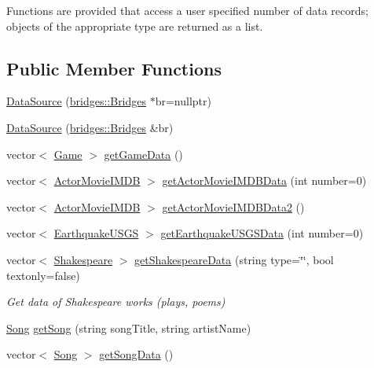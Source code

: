 Functions are provided that access a user specified number of data records; objects of the appropriate type are returned as a list. \subsection*{Public Member Functions}
\begin{DoxyCompactItemize}
\item 
\hyperlink{classbridges_1_1_data_source_afc95b52d2ca03a92c1f1ee1594a097c7}{Data\+Source} (\hyperlink{classbridges_1_1_bridges}{bridges\+::\+Bridges} $\ast$br=nullptr)
\item 
\hyperlink{classbridges_1_1_data_source_a0da0dc59d798aa3266df7931a396a4c9}{Data\+Source} (\hyperlink{classbridges_1_1_bridges}{bridges\+::\+Bridges} \&br)
\item 
vector$<$ \hyperlink{classbridges_1_1dataset_1_1_game}{Game} $>$ \hyperlink{classbridges_1_1_data_source_aa902e1dffd4169e2f6e6820299b8cde1}{get\+Game\+Data} ()
\item 
vector$<$ \hyperlink{classbridges_1_1dataset_1_1_actor_movie_i_m_d_b}{Actor\+Movie\+I\+M\+DB} $>$ \hyperlink{classbridges_1_1_data_source_a664694136550312ab3f5a82bebb91bca}{get\+Actor\+Movie\+I\+M\+D\+B\+Data} (int number=0)
\item 
vector$<$ \hyperlink{classbridges_1_1dataset_1_1_actor_movie_i_m_d_b}{Actor\+Movie\+I\+M\+DB} $>$ \hyperlink{classbridges_1_1_data_source_a00f0a0a1871d4864c6ccdd04195e0fb2}{get\+Actor\+Movie\+I\+M\+D\+B\+Data2} ()
\item 
vector$<$ \hyperlink{classbridges_1_1dataset_1_1_earthquake_u_s_g_s}{Earthquake\+U\+S\+GS} $>$ \hyperlink{classbridges_1_1_data_source_a6645e2029915550fcac5f9fed7870119}{get\+Earthquake\+U\+S\+G\+S\+Data} (int number=0)
\item 
vector$<$ \hyperlink{classbridges_1_1dataset_1_1_shakespeare}{Shakespeare} $>$ \hyperlink{classbridges_1_1_data_source_a8b73299a4c1c71d2e32431a8d4a7be81}{get\+Shakespeare\+Data} (string type=\char`\"{}\char`\"{}, bool textonly=false)
\begin{DoxyCompactList}\small\item\em Get data of Shakespeare works (plays, poems) \end{DoxyCompactList}\item 
\hyperlink{classbridges_1_1dataset_1_1_song}{Song} \hyperlink{classbridges_1_1_data_source_a284c9d572415b67df6989ab8ab97d0e2}{get\+Song} (string song\+Title, string artist\+Name)
\item 
vector$<$ \hyperlink{classbridges_1_1dataset_1_1_song}{Song} $>$ \hyperlink{classbridges_1_1_data_source_a5e8d035a1becf96c71569e0966e93849}{get\+Song\+Data} ()

\end{DoxyCompactItemize}
